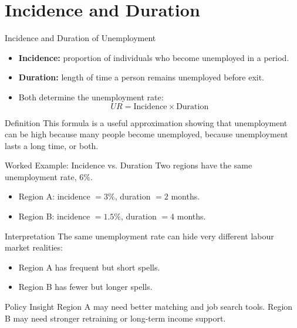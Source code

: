 \documentclass[aspectratio=169]{beamer}
\begin{document}
\section{Incidence and Duration}

\begin{frame}{Incidence and Duration of Unemployment}
\transfade
\begin{itemize}[<+->]
  \item \textbf{Incidence:} proportion of individuals who become unemployed in a period.
  \item \textbf{Duration:} length of time a person remains unemployed before exit.
  \item Both determine the unemployment rate:
  \[
  UR = \text{Incidence} \times \text{Duration}
  \]
\end{itemize}

\begin{block}{Definition}
This formula is a useful approximation showing that unemployment can be high because many people become unemployed, because unemployment lasts a long time, or both.
\end{block}
\end{frame}

\begin{frame}{Worked Example: Incidence vs. Duration}
\transfade
Two regions have the same unemployment rate, \(6\%\).

\begin{itemize}[<+->]
  \item Region A: incidence \(= 3\%\), duration \(= 2\) months.
  \item Region B: incidence \(= 1.5\%\), duration \(= 4\) months.
\end{itemize}

\begin{block}{Interpretation}
The same unemployment rate can hide very different labour market realities:
\begin{itemize}[<+->]
  \item Region A has frequent but short spells.
  \item Region B has fewer but longer spells.
\end{itemize}
\end{block}

\begin{exampleblock}{Policy Insight}
Region A may need better matching and job search tools. Region B may need stronger retraining or long-term income support.
\end{exampleblock}
\end{frame}
\end{document}
